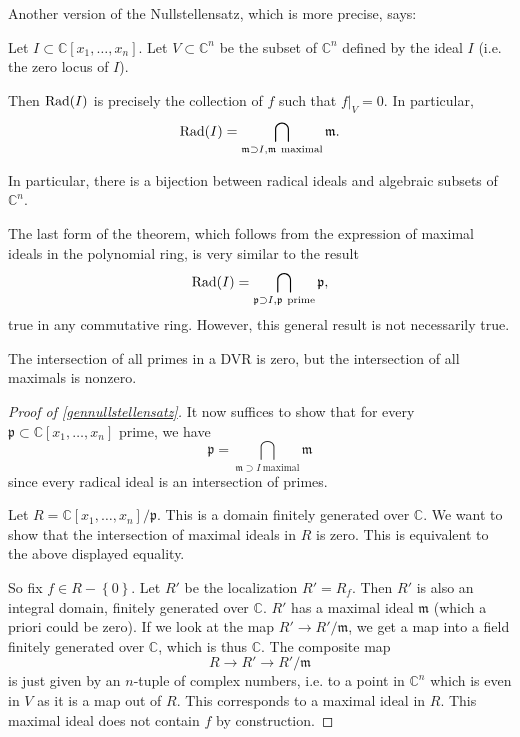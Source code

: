  Another version of the Nullstellensatz, which is
more precise, says:

\begin{theorem} \label{gennullstellensatz}
Let $I \subset \mathbb{C}[x_1, \dots, x_n]$. Let $V \subset \mathbb{C}^n$ be
the subset of $\mathbb{C}^n$ defined by the ideal $I$ (i.e. the zero locus of
$I$).

Then $\operatorname{Rad}(I)$ is precisely the collection of $f$ such that $f|_V = 0$. In
particular,
\[ \operatorname{Rad}(I) = \bigcap_{\mathfrak{m} \supset I, \mathfrak{m} \
\mathrm{maximal}} \mathfrak{m}.  \]
\end{theorem}

In particular, there is a bijection between radical ideals and algebraic
subsets of $\mathbb{C}^n$.

The last form of the theorem, which follows from the expression of maximal
ideals in the polynomial ring, is very similar to the result
\[ \operatorname{Rad}(I) = \bigcap_{\mathfrak{p} \supset I, \mathfrak{p} \
\mathrm{prime}} \mathfrak{p},  \]
true in any commutative ring. However, this general result is not necessarily
true.

\begin{example}
The intersection of all primes in a DVR is zero, but the intersection of all
maximals is nonzero.
\end{example}

\begin{proof}[Proof of \cref{gennullstellensatz}] 
It now suffices to show that for every $\mathfrak{p} \subset \mathbb{C}[x_1,
\dots, x_n]$ prime, we have
\[ \mathfrak{p} = \bigcap_{\mathfrak{m} \supset I \ \mathrm{maximal}}
\mathfrak{m}  \]
since every radical ideal is an intersection of primes.

Let $R = \mathbb{C}[x_1, \dots,
x_n]/\mathfrak{p}$. This is a domain finitely generated over $\mathbb{C}$. We
want to show that the intersection of maximal ideals in $R$ is zero. This is
equivalent to the above displayed equality.

So fix $f \in R - \left\{0\right\}$. Let $R'$ be the localization $R'= R_f$. Then $R'$ is also an
integral domain, finitely generated over $\mathbb{C}$.	$R'$ has a maximal
ideal $\mathfrak{m}$ (which a priori could be zero). If
we look at the map $R' \to R'/\mathfrak{m}$, we get a map into a field
finitely generated
over $\mathbb{C}$, which is thus $\mathbb{C}$.
The composite map
\[ R \to  R' \to R'/\mathfrak{m}   \]
is just given by an $n$-tuple of complex numbers, i.e. to a point in
$\mathbb{C}^n$ which is even in $V$ as it is a map out of $R$. This corresponds
to a maximal ideal in $R$.
This maximal ideal does not contain $f$ by construction.
\end{proof}

